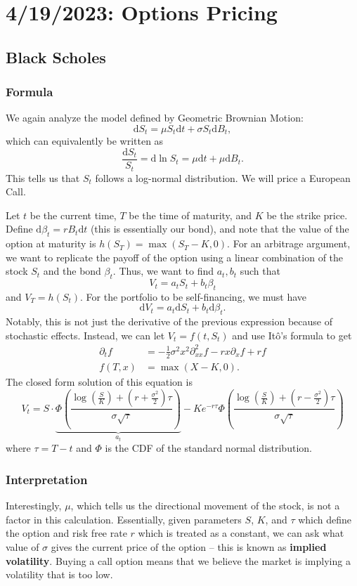 \chapter{4/19/2023: Options Pricing}
\section{Black Scholes}
\subsection{Formula}
We again analyze the model defined by Geometric Brownian Motion: $$ \mathrm dS_t = \mu S_t \mathrm dt + \sigma S_t \mathrm dB_t, $$ which can equivalently be written as $$ \frac{\mathrm dS_t}{S_t} = \mathrm d\ln S_t = \mu\mathrm dt + \mu\mathrm d B_t. $$ This tells us that $S_t$ follows a log-normal distribution. We will price a European Call.

Let $t$ be the current time, $T$ be the time of maturity, and $K$ be the strike price. Define $ \mathrm d\beta_t = r B_t\mathrm dt $ (this is essentially our bond), and note that the value of the option at maturity is $h(S_T) = \max(S_T-K,0)$. For an arbitrage argument, we want to replicate the payoff of the option using a linear combination of the stock $S_t$ and the bond $\beta_t$. Thus, we want to find $a_t,b_t$ such that $$ V_t = a_tS_t + b_t\beta_t $$ and $V_T = h(S_t)$. For the portfolio to be self-financing, we must have $$ \mathrm dV_t = a_t\mathrm dS_t + b_t\mathrm d\beta_t. $$ Notably, this is not just the derivative of the previous expression because of stochastic effects. Instead, we can let $V_t=f(t,S_t)$ and use It\^{o}'s formula to get \begin{align*}
	\partial_t f &= -\frac{1}{2}\sigma^2 x^2\partial_{xx}^2 f - rx\partial_x f + rf \\
	f(T,x) &= \max(X-K,0).
\end{align*} The closed form solution of this equation is $$ 
V_t = S\cdot\underbrace{\Phi \left( \frac{\log \left( \frac{S}{K} \right) + \left( r + \frac{\sigma^2}{2} \right) \tau}{\sigma\sqrt{\tau}} \right)}_{a_t} - K e^{-r\tau} \Phi \left( \frac{\log \left( \frac{S}{K} \right) + \left( r - \frac{\sigma^2}{2} \right) \tau}{\sigma\sqrt{\tau}} \right) 
$$ where $\tau=T-t$ and $\Phi$ is the CDF of the standard normal distribution.

\subsection{Interpretation}
Interestingly, $\mu$, which tells us the directional movement of the stock, is not a factor in this calculation. Essentially, given parameters $S$, $K$, and $\tau$ which define the option and risk free rate $r$ which is treated as a constant, we can ask what value of $\sigma$ gives the current price of the option -- this is known as \textbf{implied volatility}. Buying a call option means that we believe the market is implying a volatility that is too low.

